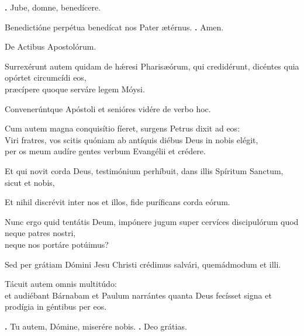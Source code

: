 \begin{small}
\textbf{\Vbar.} Jube, domne, benedícere.

Benedictióne perpétua benedícat nos Pater ætérnus. \textbf{\Rbar.} Amen.
\end{small}


De Actibus Apostolórum.

Surrexérunt autem quidam de hǽresi Pharisæórum, qui credidérunt, dicéntes quia opórtet circumcídi eos,\\
præcípere quoque serváre legem Móysi.

Convenerúntque Apóstoli et senióres vidére de verbo hoc.

Cum autem magna conquisítio fíeret, surgens Petrus dixit ad eos: \\
Viri fratres, vos scitis quóniam ab antíquis diébus Deus in nobis elégit,\\ per os meum audíre gentes verbum Evangélii et crédere.

Et qui novit corda Deus, testimónium perhíbuit, dans illis Spíritum Sanctum, sicut et nobis,

Et nihil discrévit inter nos et illos, fide puríficans corda eórum.

Nunc ergo quid tentátis Deum, impónere jugum super cervíces discipulórum quod neque patres nostri, \\
neque nos portáre potúimus?

Sed per grátiam Dómini Jesu Christi crédimus salvári, quemádmodum et illi.

Tácuit autem omnis multitúdo: \\
et audiébant Bárnabam et Paulum narrántes quanta Deus fecísset signa et prodígia in géntibus per eos.

\textbf{\Vbar.} Tu autem, Dómine, miserére nobis.
\textbf{\Rbar.} Deo grátias.

